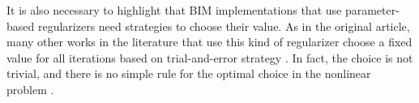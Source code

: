 			It is also necessary to highlight that BIM implementations that use parameter-based regularizers need strategies to choose their value. As in the original article, many other works in the literature that use this kind of regularizer choose a fixed value for all iterations based on trial-and-error strategy \citep{chew1995frequency,yao1997frequency,li2004three,chew1994inversion,batista2021quadratic}. In fact, the choice is not trivial, and there is no simple rule for the optimal choice in the nonlinear problem \citep{engl1988convergence}.
			

